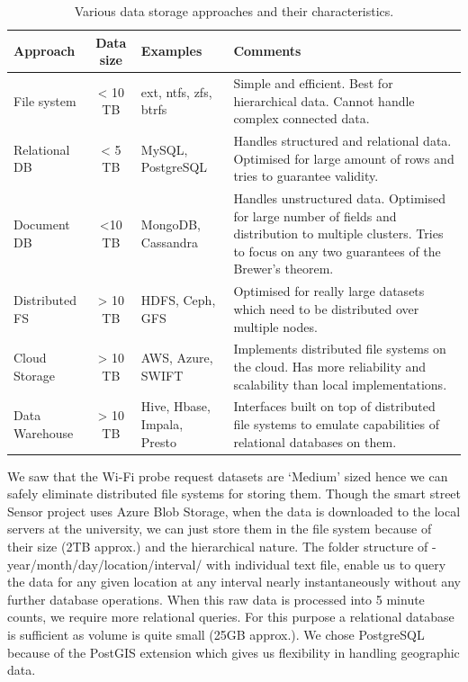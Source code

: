 \begin{table}[h]
  \footnotesize
  \begin{center}
    \begin{tabular}{lcp{2cm}p{4.5cm}}
      \toprule
      Approach & Data size & Examples & Comments\\
      \midrule
        File system &
          \textless{} 10 TB &
          ext, ntfs, zfs, btrfs &
          Simple and efficient. Best for hierarchical data. Cannot handle complex connected data.\\
        \addlinespace[0.2cm]
        Relational DB &
          \textless{} 5 TB &
          MySQL, PostgreSQL&
          Handles structured and relational data. Optimised for large amount of rows and tries to guarantee validity.\\
        \addlinespace[0.2cm]
        Document DB &
          \textless 10 TB &
          MongoDB, Cassandra&
          Handles unstructured data. Optimised for large number of fields and distribution to multiple clusters. Tries to focus on any two guarantees of the Brewer's theorem.\\
        \addlinespace[0.2cm]
        Distributed FS &
          \textgreater{} 10 TB &
          HDFS, Ceph, GFS &
          Optimised for really large datasets which need to be distributed over multiple nodes.\\
        \addlinespace[0.2cm]
        Cloud Storage &
          \textgreater{} 10 TB &
          AWS, Azure, SWIFT &
          Implements distributed file systems on the cloud. Has more reliability and scalability than local implementations.\\
        \addlinespace[0.2cm]
        Data Warehouse &
          \textgreater{} 10 TB &
          Hive, Hbase, Impala, Presto&
          Interfaces built on top of distributed file systems to emulate capabilities of relational databases on them.\\
      \bottomrule
    \end{tabular}
  \end{center}
  \caption{Various data storage approaches and their characteristics.}
  \label{table:toolkit:storage}
\end{table}

We saw that the Wi-Fi probe request datasets are `Medium' sized hence we can safely eliminate distributed file systems for storing them.
Though the smart street Sensor project uses Azure Blob Storage, when the data is downloaded to the local servers at the university, we can just store them in the file system because of their size (2TB approx.) and the hierarchical nature.
The folder structure of - year/month/day/location/interval/ with individual text file, enable us to query the data for any given location at any interval nearly instantaneously without any further database operations.
When this raw data is processed into 5 minute counts, we require more relational queries.
For this purpose a relational database is sufficient as volume is quite small (25GB approx.).
We chose PostgreSQL because of the PostGIS extension which gives us flexibility in handling geographic data.

